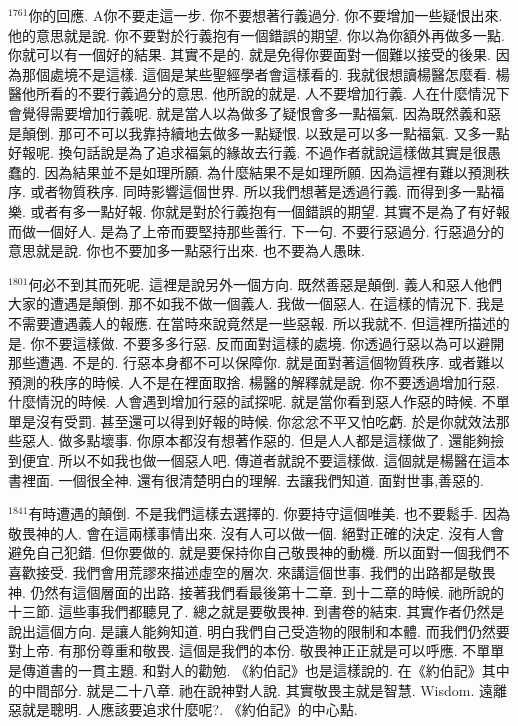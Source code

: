 \documentclass{book}
\begin{document}
$^{1761}$你的回應.
A你不要走這一步.
你不要想著行義過分.
你不要增加一些疑恨出來.
他的意思就是說.
你不要對於行義抱有一個錯誤的期望.
你以為你額外再做多一點.
你就可以有一個好的結果.
其實不是的.
就是免得你要面對一個難以接受的後果.
因為那個處境不是這樣.
這個是某些聖經學者會這樣看的.
我就很想讀楊醫怎麼看.
楊醫他所看的不要行義過分的意思.
他所說的就是.
人不要增加行義.
人在什麼情況下會覺得需要增加行義呢.
就是當人以為做多了疑恨會多一點福氣.
因為既然義和惡是顛倒.
那可不可以我靠持續地去做多一點疑恨.
以致是可以多一點福氣.
又多一點好報呢.
換句話說是為了追求福氣的緣故去行義.
不過作者就說這樣做其實是很愚蠢的.
因為結果並不是如理所願.
為什麼結果不是如理所願.
因為這裡有難以預測秩序.
或者物質秩序.
同時影響這個世界.
所以我們想著是透過行義.
而得到多一點福樂.
或者有多一點好報.
你就是對於行義抱有一個錯誤的期望.
其實不是為了有好報而做一個好人.
是為了上帝而要堅持那些善行.
下一句.
不要行惡過分.
行惡過分的意思就是說.
你也不要加多一點惡行出來.
也不要為人愚昧.

$^{1801}$何必不到其而死呢.
這裡是說另外一個方向.
既然善惡是顛倒.
義人和惡人他們大家的遭遇是顛倒.
那不如我不做一個義人.
我做一個惡人.
在這樣的情況下.
我是不需要遭遇義人的報應.
在當時來說竟然是一些惡報.
所以我就不.
但這裡所描述的是.
你不要這樣做.
不要多多行惡.
反而面對這樣的處境.
你透過行惡以為可以避開那些遭遇.
不是的.
行惡本身都不可以保障你.
就是面對著這個物質秩序.
或者難以預測的秩序的時候.
人不是在裡面取捨.
楊醫的解釋就是說.
你不要透過增加行惡.
什麼情況的時候.
人會遇到增加行惡的試探呢.
就是當你看到惡人作惡的時候.
不單單是沒有受罰.
甚至還可以得到好報的時候.
你忿忿不平又怕吃虧.
於是你就效法那些惡人.
做多點壞事.
你原本都沒有想著作惡的.
但是人人都是這樣做了.
還能夠撿到便宜.
所以不如我也做一個惡人吧.
傳道者就說不要這樣做.
這個就是楊醫在這本書裡面.
一個很全神.
還有很清楚明白的理解.
去讓我們知道.
面對世事,善惡的.

$^{1841}$有時遭遇的顛倒.
不是我們這樣去選擇的.
你要持守這個唯美.
也不要鬆手.
因為敬畏神的人.
會在這兩樣事情出來.
沒有人可以做一個.
絕對正確的決定.
沒有人會避免自己犯錯.
但你要做的.
就是要保持你自己敬畏神的動機.
所以面對一個我們不喜歡接受.
我們會用荒謬來描述虛空的層次.
來講這個世事.
我們的出路都是敬畏神.
仍然有這個層面的出路.
接著我們看最後第十二章.
到十二章的時候.
祂所說的十三節.
這些事我們都聽見了.
總之就是要敬畏神.
到書卷的結束.
其實作者仍然是說出這個方向.
是讓人能夠知道.
明白我們自己受造物的限制和本體.
而我們仍然要對上帝.
有那份尊重和敬畏.
這個是我們的本份.
敬畏神正正就是可以呼應.
不單單是傳道書的一貫主題.
和對人的勸勉.
《約伯記》也是這樣說的.
在《約伯記》其中的中間部分.
就是二十八章.
祂在說神對人說.
其實敬畏主就是智慧.
Wisdom.
遠離惡就是聰明.
人應該要追求什麼呢?.
《約伯記》的中心點.
\end{document}
